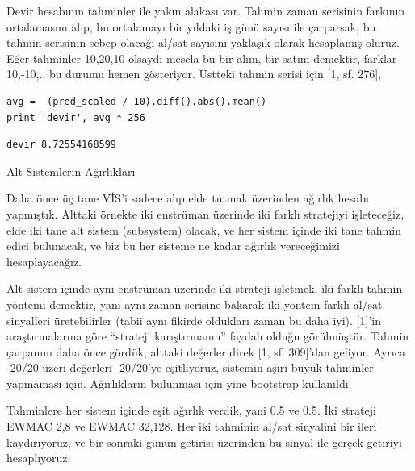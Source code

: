 \documentclass[12pt,fleqn]{article}\usepackage{../../common}
\begin{document}
Devir hesabının tahminler ile yakın alakası var. Tahmin zaman serisinin farkının
ortalamasını alıp, bu ortalamayı bir yıldaki iş günü sayısı ile çarparsak, bu
tahmin serisinin sebep olacağı al/sat sayısını yaklaşık olarak hesaplamış
oluruz. Eğer tahminler 10,20,10 olsaydı mesela bu bir alım, bir satım demektir,
farklar 10,-10,.. bu durumu hemen gösteriyor. Üstteki tahmin serisi için [1,
  sf. 276],

\begin{verbatim}
avg =  (pred_scaled / 10).diff().abs().mean()
print 'devir', avg * 256
\end{verbatim}

\begin{verbatim}
devir 8.72554168599
\end{verbatim}

Alt Sistemlerin Ağırlıkları

Daha önce üç tane VİS'i sadece alıp elde tutmak üzerinden ağırlık hesabı
yapmıştık. Alttaki örnekte iki enstrüman üzerinde iki farklı stratejiyi
işleteceğiz, elde iki tane alt sistem (subsystem) olacak, ve her sistem içinde
iki tane tahmin edici bulunacak, ve biz bu her sisteme ne kadar ağırlık
vereceğimizi hesaplayacağız.

Alt sistem içinde aynı enstrüman üzerinde iki strateji işletmek, iki farklı
tahmin yöntemi demektir, yani aynı zaman serisine bakarak iki yöntem farklı
al/sat sinyalleri üretebilirler (tabii aynı fikirde oldukları zaman bu daha
iyi). [1]'in araştırmalarına göre ``strateji karıştırmanın'' faydalı olduğu
görülmüştür. Tahmin çarpanını daha önce gördük, alttaki değerler direk [1,
  sf. 309]'dan geliyor. Ayrıca -20/20 üzeri değerleri -20/20'ye eşitliyoruz,
sistemin aşırı büyük tahminler yapmaması için. Ağırlıkların bulunması için yine
bootstrap kullanıldı.

Tahminlere her sistem içinde eşit ağırlık verdik, yani 0.5 ve 0.5. İki strateji
EWMAC 2,8 ve EWMAC 32,128. Her iki tahminin al/sat sinyalini bir ileri
kaydırıyoruz, ve bir sonraki günün getirisi üzerinden bu sinyal ile gerçek
getiriyi hesaplıyoruz.
\end{document}
